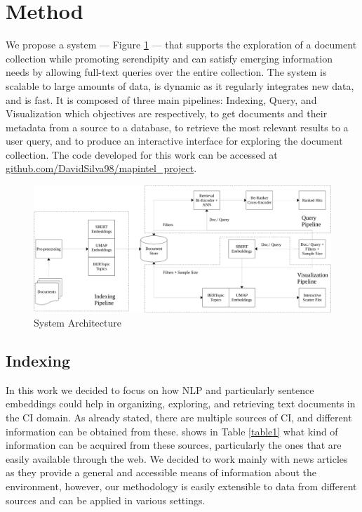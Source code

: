 \documentclass[a4paper]{article}
\begin{document}

\section{Method}
We propose a system — Figure \ref{system_architecture} — that supports the exploration of a document collection while promoting serendipity and can satisfy emerging information needs by allowing full-text queries over the entire collection.
The system is scalable to large amounts of data, is dynamic as it regularly integrates new data, and is fast. It is composed of three main pipelines: Indexing, Query, and Visualization which objectives are respectively, to get documents and their metadata from a source to a database, to retrieve the most relevant results to a user query, and to produce an interactive interface for exploring the document collection. The code developed for this work can be accessed at \href{https://github.com/DavidSilva98/mapintel_project}{github.com/DavidSilva98/mapintel\_project}.

\begin{figure}[H]
	\centering
	\includegraphics[scale=0.5]{./assets/system_architecture}
	\caption{System Architecture}
	\label{system_architecture}
\end{figure}

\subsection{Indexing} \label{indexing}
In this work we decided to focus on how NLP and particularly sentence embeddings could help in organizing, exploring, and retrieving text documents in the CI domain. As already stated, there are multiple sources of CI, and different information can be obtained from these. \citet{dey2011} shows in Table \ref{table1} what kind of information can be acquired from these sources, particularly the ones that are easily available through the web. We decided to work mainly with news articles as they provide a general and accessible means of information about the environment, however, our methodology is easily extensible to data from different sources and can be applied in various settings. 
\end{document}
